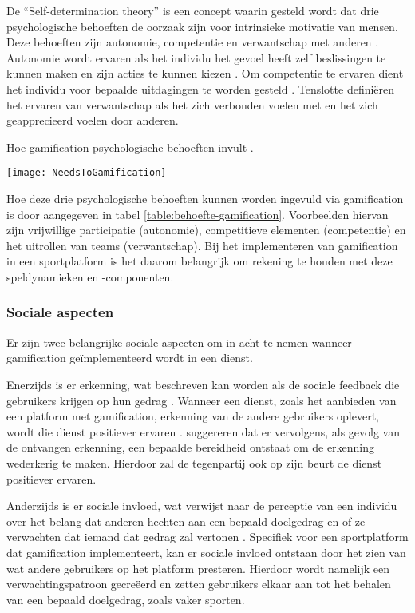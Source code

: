 De “Self-determination theory” is een concept waarin gesteld wordt dat drie psychologische behoeften de oorzaak zijn voor intrinsieke motivatie van mensen. Deze behoeften zijn autonomie, competentie en verwantschap met anderen \autocite{Ryan2000}.
Autonomie wordt ervaren als het individu het gevoel heeft zelf beslissingen te kunnen maken en zijn acties te kunnen kiezen \autocite{Ryan2000}.
Om competentie te ervaren dient het individu voor bepaalde uitdagingen te worden gesteld \autocite{Kam2018}. Tenslotte definiëren \textcite{Kam2018} het ervaren van verwantschap als het zich verbonden voelen met en het zich geapprecieerd voelen door anderen.

\begin{table}[h]
    \caption[Hoe gamification psychologische behoeften invult]{Hoe gamification psychologische behoeften invult \autocite{Kam2018}.}
    \texttt{[image: NeedsToGamification]}
    \label{table:behoefte-gamification}
\end{table}

Hoe deze drie psychologische behoeften kunnen worden ingevuld via gamification is door \textcite{Kam2018} aangegeven in tabel \ref{table:behoefte-gamification}. Voorbeelden hiervan zijn vrijwillige participatie (autonomie), competitieve elementen (competentie) en het uitrollen van teams (verwantschap). Bij het implementeren van gamification in een sportplatform is het daarom belangrijk om rekening te houden met deze speldynamieken en -componenten.

\subsubsection{Sociale aspecten}
\label{ssec:sociale_aspecen}
Er zijn twee belangrijke sociale aspecten om in acht te nemen wanneer gamification geïmplementeerd wordt in een dienst.

Enerzijds is er erkenning, wat beschreven kan worden als de sociale feedback die gebruikers krijgen op hun gedrag \autocite{Cheung2011}.
Wanneer een dienst, zoals het aanbieden van een platform met gamification, erkenning van de andere gebruikers oplevert, wordt die dienst positiever ervaren \autocite{Preece2001}.
\textcite{Hamari2013} suggereren dat er vervolgens, als gevolg van de ontvangen erkenning, een bepaalde bereidheid ontstaat om de erkenning wederkerig te maken. Hierdoor zal de tegenpartij ook op zijn beurt de dienst positiever ervaren.

Anderzijds is er sociale invloed, wat verwijst naar de perceptie van een individu over het belang dat anderen hechten aan een bepaald doelgedrag en of ze verwachten dat iemand dat gedrag zal vertonen \autocite{Ajzen1991}. Specifiek voor een sportplatform dat gamification implementeert, kan er sociale invloed ontstaan door het zien van wat andere gebruikers op het platform presteren. Hierdoor wordt namelijk een verwachtingspatroon gecreëerd en zetten gebruikers elkaar aan tot het behalen van een bepaald doelgedrag, zoals vaker sporten.


